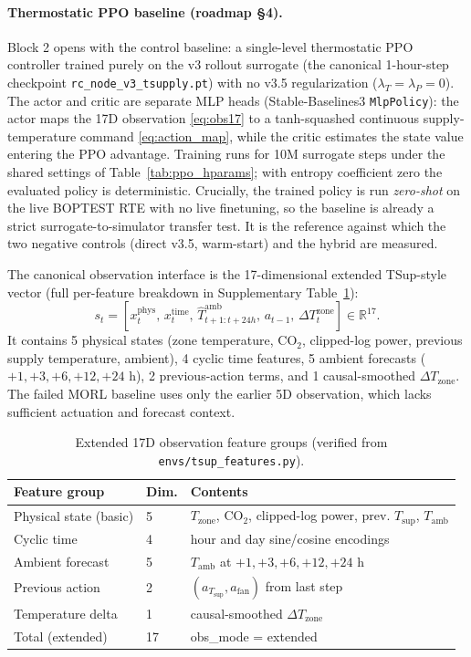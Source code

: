 \documentclass[11pt,a4paper]{article}
\begin{document}
\paragraph{Thermostatic PPO baseline (roadmap \S4).} Block 2 opens with the control baseline: a single-level thermostatic PPO controller trained purely on the v3 rollout surrogate (the canonical 1-hour-step checkpoint \texttt{rc\_node\_v3\_tsupply.pt}) with no v3.5 regularization ($\lambda_T=\lambda_P=0$). The actor and critic are separate MLP heads (Stable-Baselines3 \texttt{MlpPolicy}): the actor maps the 17D observation \eqref{eq:obs17} to a tanh-squashed continuous supply-temperature command \eqref{eq:action_map}, while the critic estimates the state value entering the PPO advantage. Training runs for 10M surrogate steps under the shared settings of Table~\ref{tab:ppo_hparams}; with entropy coefficient zero the evaluated policy is deterministic. Crucially, the trained policy is run \emph{zero-shot} on the live BOPTEST RTE with no live finetuning, so the baseline is already a strict surrogate-to-simulator transfer test. It is the reference against which the two negative controls (direct v3.5, warm-start) and the hybrid are measured.

The canonical observation interface is the 17-dimensional extended TSup-style vector (full per-feature breakdown in Supplementary Table~\ref{tab:obs17}):
\begin{equation}
  s_t =
  \left[
  x^{\mathrm{phys}}_t,\,
  x^{\mathrm{time}}_t,\,
  \widehat{T}^{\mathrm{amb}}_{t+1:t+24h},\,
  a_{t-1},\,
  \Delta T^{\mathrm{zone}}_t
  \right] \in \mathbb{R}^{17}.
  \label{eq:obs17}
\end{equation}
It contains 5 physical states (zone temperature, CO$_2$, clipped-log power, previous supply temperature, ambient), 4 cyclic time features, 5 ambient forecasts ($+1,+3,+6,+12,+24$ h), 2 previous-action terms, and 1 causal-smoothed $\Delta T_{\mathrm{zone}}$. The failed MORL baseline uses only the earlier 5D observation, which lacks sufficient actuation and forecast context.

\begin{table}[H]
\centering
\caption{Extended 17D observation feature groups (verified from \texttt{envs/tsup\_features.py}).}
\label{tab:obs17}
\small
\begin{tabularx}{\linewidth}{llX}
\toprule
Feature group & Dim. & Contents \\
\midrule
Physical state (basic) & 5 & $T_{\mathrm{zone}}$, CO$_2$, clipped-log power, prev. $T_{\mathrm{sup}}$, $T_{\mathrm{amb}}$ \\
Cyclic time & 4 & hour and day sine/cosine encodings \\
Ambient forecast & 5 & $T_{\mathrm{amb}}$ at $+1,+3,+6,+12,+24$ h \\
Previous action & 2 & $(a_{T_{\mathrm{sup}}}, a_{\mathrm{fan}})$ from last step \\
Temperature delta & 1 & causal-smoothed $\Delta T_{\mathrm{zone}}$ \\
Total (extended) & 17 & obs\_mode = extended \\
\bottomrule
\end{tabularx}
\end{table}
\end{document}
